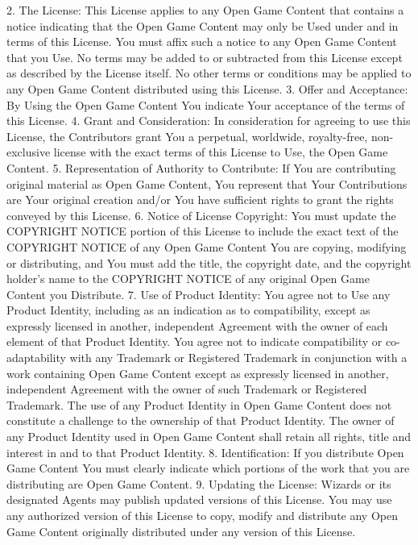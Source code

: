 \begin{multicols}{2}
2. The License: This License applies to any Open Game Content that contains a notice indicating that the Open Game Content may only be Used under and in terms of this License. You must affix such a notice to any Open Game Content that you Use. No terms may be added to or subtracted from this License except as described by the License itself. No other terms or conditions may be applied to any Open Game Content distributed using this License.
3. Offer and Acceptance: By Using the Open Game Content You indicate Your acceptance of the terms of this License.
4. Grant and Consideration: In consideration for agreeing to use this License, the Contributors grant You a perpetual, worldwide, royalty-free, non-exclusive license with the exact terms of this License to Use, the Open Game Content.
5. Representation of Authority to Contribute: If You are contributing original material as Open Game Content, You represent that Your Contributions are Your original creation and/or You have sufficient rights to grant the rights conveyed by this License.
6. Notice of License Copyright: You must update the COPYRIGHT NOTICE portion of this License to include the exact text of the COPYRIGHT NOTICE of any Open Game Content You are copying, modifying or distributing, and You must add the title, the copyright date, and the copyright holder’s name to the COPYRIGHT NOTICE of any original Open Game Content you Distribute.
7. Use of Product Identity: You agree not to Use any Product Identity, including as an indication as to compatibility, except as expressly licensed in another, independent Agreement with the owner of each element of that Product Identity. You agree not to indicate compatibility or co-adaptability with any Trademark or Registered Trademark in conjunction with a work containing Open Game Content except as expressly licensed in another, independent Agreement with the owner of such Trademark or Registered Trademark. The use of any Product Identity in Open Game Content does not constitute a challenge to the ownership of that Product Identity. The owner of any Product Identity used in Open Game Content shall retain all rights, title and interest in and to that Product Identity.
8. Identification: If you distribute Open Game Content You must clearly indicate which portions of the work that you are distributing are Open Game Content.
9. Updating the License: Wizards or its designated Agents may publish updated versions of this License. You may use any authorized version of this License to copy, modify and distribute any Open Game Content originally distributed under any version of this License.

\end{multicols}
